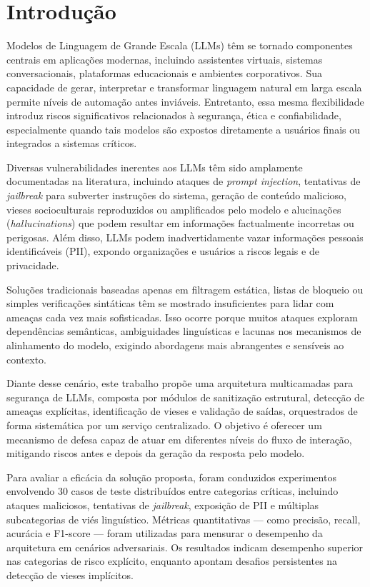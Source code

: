 \section{Introdução}
\label{sec:introduction}

Modelos de Linguagem de Grande Escala (LLMs) têm se tornado componentes centrais em aplicações modernas, incluindo assistentes virtuais, sistemas conversacionais, plataformas educacionais e ambientes corporativos. Sua capacidade de gerar, interpretar e transformar linguagem natural em larga escala permite níveis de automação antes inviáveis. Entretanto, essa mesma flexibilidade introduz riscos significativos relacionados à segurança, ética e confiabilidade, especialmente quando tais modelos são expostos diretamente a usuários finais ou integrados a sistemas críticos.

Diversas vulnerabilidades inerentes aos LLMs têm sido amplamente documentadas na literatura, incluindo ataques de \textit{prompt injection}, tentativas de \textit{jailbreak} para subverter instruções do sistema, geração de conteúdo malicioso, vieses socioculturais reproduzidos ou amplificados pelo modelo e alucinações (\textit{hallucinations}) que podem resultar em informações factualmente incorretas ou perigosas. Além disso, LLMs podem inadvertidamente vazar informações pessoais identificáveis (PII), expondo organizações e usuários a riscos legais e de privacidade.

Soluções tradicionais baseadas apenas em filtragem estática, listas de bloqueio ou simples verificações sintáticas têm se mostrado insuficientes para lidar com ameaças cada vez mais sofisticadas. Isso ocorre porque muitos ataques exploram dependências semânticas, ambiguidades linguísticas e lacunas nos mecanismos de alinhamento do modelo, exigindo abordagens mais abrangentes e sensíveis ao contexto.

Diante desse cenário, este trabalho propõe uma arquitetura multicamadas para segurança de LLMs, composta por módulos de sanitização estrutural, detecção de ameaças explícitas, identificação de vieses e validação de saídas, orquestrados de forma sistemática por um serviço centralizado. O objetivo é oferecer um mecanismo de defesa capaz de atuar em diferentes níveis do fluxo de interação, mitigando riscos antes e depois da geração da resposta pelo modelo.

Para avaliar a eficácia da solução proposta, foram conduzidos experimentos envolvendo 30 casos de teste distribuídos entre categorias críticas, incluindo ataques maliciosos, tentativas de \textit{jailbreak}, exposição de PII e múltiplas subcategorias de viés linguístico. Métricas quantitativas — como precisão, recall, acurácia e F1-score — foram utilizadas para mensurar o desempenho da arquitetura em cenários adversariais. Os resultados indicam desempenho superior nas categorias de risco explícito, enquanto apontam desafios persistentes na detecção de vieses implícitos.

